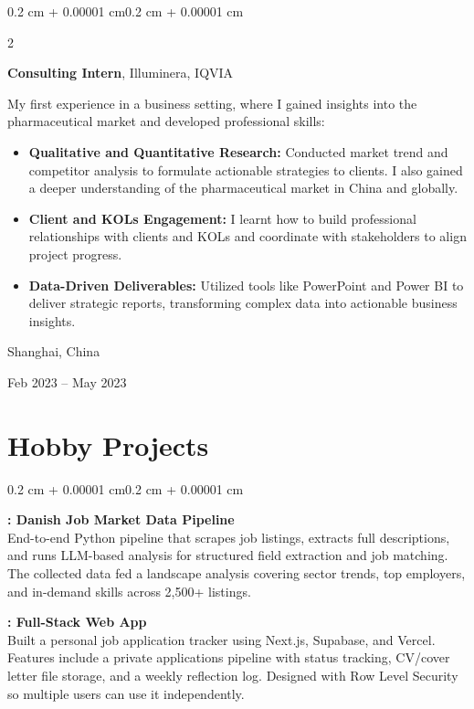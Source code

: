 \documentclass[10pt, letterpaper]{article}
\newenvironment{highlights}{
    \begin{itemize}[
        topsep=0.10 cm,
        parsep=0.10 cm,
        partopsep=0pt,
        itemsep=0pt,
        leftmargin=0.4 cm + 10pt
    ]
}{
    \end{itemize}
}
\newenvironment{onecolentry}{
    \begin{adjustwidth}{0.2 cm + 0.00001 cm}{0.2 cm + 0.00001 cm}
}{
    \end{adjustwidth}
}
\newenvironment{twocolentry}[2][]{
    \onecolentry
    \def\secondColumn{#2}
    \setcolumnwidth{\fill, 4.5 cm}
    \begin{paracol}{2}
}{
    \switchcolumn \raggedleft \secondColumn
    \end{paracol}
    \endonecolentry
}
\let\hrefWithoutArrow\href
\renewcommand{\href}[2]{\hrefWithoutArrow{#1}{\ifthenelse{\equal{#2}{}}{ }{#2 }\raisebox{.15ex}{\footnotesize \faExternalLink*}}}
\begin{document}
        \begin{twocolentry}{
    Shanghai, China

    Feb 2023 -- May 2023
}
    \textbf{Consulting Intern}, Illuminera, IQVIA

    \vspace{0.1cm}

    My first experience in a business setting, where I gained insights into the pharmaceutical market and developed professional skills:

    \begin{highlights}
        \item \textbf{Qualitative and Quantitative Research:} Conducted market trend and competitor analysis to formulate actionable strategies to clients. I also gained a deeper understanding of the pharmaceutical market in China and globally.

        \vspace{0.1cm}

        \item \textbf{Client and KOLs Engagement:} I learnt how to build professional relationships with clients and KOLs and coordinate with stakeholders to align project progress.

        \vspace{0.1cm}

        \item \textbf{Data-Driven Deliverables:} Utilized tools like PowerPoint and Power BI to deliver strategic reports, transforming complex data into actionable business insights.
    \end{highlights}
\end{twocolentry}

        \vspace{0.3 cm}


    \section{Hobby Projects}

\begin{onecolentry}

\textbf{\href{https://github.com/chunxubioinfor/Job_dk}{Job\_dk}: Danish Job Market Data Pipeline} \\
End-to-end Python pipeline that scrapes job listings, extracts full descriptions, and runs LLM-based analysis for structured field extraction and job matching. The collected data fed a landscape analysis covering sector trends, top employers, and in-demand skills across 2,500+ listings.

        \vspace{0.3 cm}

\textbf{\href{https://github.com/chunxubioinfor/job-tracker}{Job Tracker}: Full-Stack Web App} \\
Built a personal job application tracker using Next.js, Supabase, and Vercel. Features include a private applications pipeline with status tracking, CV/cover letter file storage, and a weekly reflection log. Designed with Row Level Security so multiple users can use it independently.

\end{onecolentry}
\end{document}
